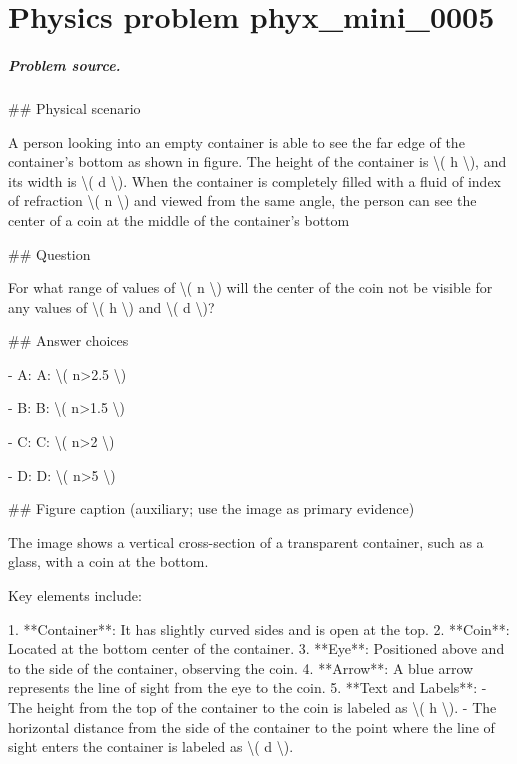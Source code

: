 
\chapter{Physics problem phyx\_mini\_0005}
\label{ch:PhyXMiniProblems_problem_phyx_mini_0005}

\paragraph{Problem source.}
\#\# Physical scenario

A person looking into an empty container is able to see the far edge of the container's bottom as shown in figure. The height of the container is \textbackslash{}( h \textbackslash{}), and its width is \textbackslash{}( d \textbackslash{}). When the container is completely filled with a fluid of index of refraction \textbackslash{}( n \textbackslash{}) and viewed from the same angle, the person can see the center of a coin at the middle of the container’s bottom

\#\# Question

For what range of values of \textbackslash{}( n \textbackslash{}) will the center of the coin not be visible for any values of \textbackslash{}( h \textbackslash{}) and \textbackslash{}( d \textbackslash{})?

\#\# Answer choices

- A: A: \textbackslash{}( n>2.5 \textbackslash{})

- B: B: \textbackslash{}( n>1.5 \textbackslash{})

- C: C: \textbackslash{}( n>2 \textbackslash{})

- D: D: \textbackslash{}( n>5 \textbackslash{})

\#\# Figure caption (auxiliary; use the image as primary evidence)

The image shows a vertical cross-section of a transparent container, such as a glass, with a coin at the bottom. 

Key elements include:

1. **Container**: It has slightly curved sides and is open at the top.
2. **Coin**: Located at the bottom center of the container.
3. **Eye**: Positioned above and to the side of the container, observing the coin.
4. **Arrow**: A blue arrow represents the line of sight from the eye to the coin.
5. **Text and Labels**:
   - The height from the top of the container to the coin is labeled as \textbackslash{}( h \textbackslash{}).
   - The horizontal distance from the side of the container to the point where the line of sight enters the container is labeled as \textbackslash{}( d \textbackslash{}).

